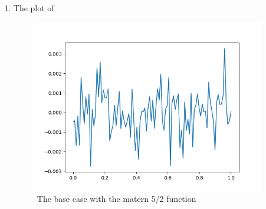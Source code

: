 \documentclass[10pt]{article}
\begin{document}
\begin{enumerate}[label=(\Alph*)]
    \item
    The plot of 
    
    \begin{figure}[htb] \centering
    \includegraphics[width=0.95\textwidth]{./matern52_case.png}
    \caption{The base case with the matern 5/2 function}
    \label{fig:matern52_case}
    \end{figure}
    
    
    
    
    
    
    
    \end{enumerate}
\end{document}
